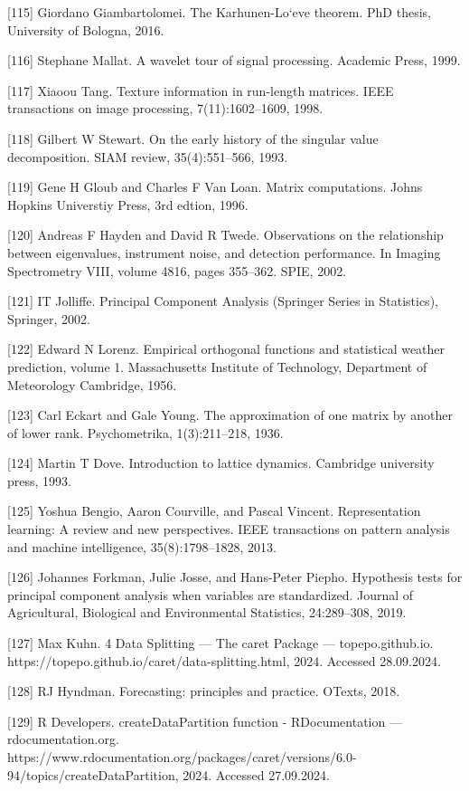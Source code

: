 \documentclass[preprint,12pt]{elsarticle}
\begin{document}
[115] Giordano Giambartolomei. The Karhunen-Lo`eve theorem. PhD thesis, University of Bologna, 2016. 

[116] Stephane Mallat. A wavelet tour of signal processing. Academic Press, 1999. 

[117] Xiaoou Tang. Texture information in run-length matrices. IEEE transactions on image processing, 7(11):1602–1609, 1998. 

[118] Gilbert W Stewart. On the early history of the singular value decomposition. SIAM review, 35(4):551–566, 1993. 

[119] Gene H Gloub and Charles F Van Loan. Matrix computations. Johns Hopkins Universtiy Press, 3rd edtion, 1996. 

[120] Andreas F Hayden and David R Twede. Observations on the relationship between eigenvalues, instrument noise, and detection performance. In Imaging Spectrometry VIII, volume 4816, pages 355–362. SPIE, 2002. 

[121] IT Jolliffe. Principal Component Analysis (Springer Series in Statistics), Springer, 2002. 

[122] Edward N Lorenz. Empirical orthogonal functions and statistical weather prediction, volume 1. Massachusetts Institute of Technology, Department of Meteorology Cambridge, 1956. 

[123] Carl Eckart and Gale Young. The approximation of one matrix by another of lower rank. Psychometrika, 1(3):211–218, 1936. 

[124] Martin T Dove. Introduction to lattice dynamics. Cambridge university press, 1993. 

[125] Yoshua Bengio, Aaron Courville, and Pascal Vincent. Representation learning: A review and new perspectives. IEEE transactions on pattern analysis and machine intelligence, 35(8):1798–1828, 2013. 

[126] Johannes Forkman, Julie Josse, and Hans-Peter Piepho. Hypothesis tests for principal component analysis when variables are standardized. Journal of Agricultural, Biological and Environmental Statistics, 24:289–308, 2019. 

[127] Max Kuhn. 4 Data Splitting — The caret Package — topepo.github.io. https://topepo.github.io/caret/data-splitting.html, 2024. Accessed 28.09.2024. 

[128] RJ Hyndman. Forecasting: principles and practice. OTexts, 2018. 

[129] R Developers. createDataPartition function - RDocumentation — rdocumentation.org. https://www.rdocumentation.org/packages/caret/versions/6.0-94/topics/createDataPartition, 2024. Accessed 27.09.2024. 
\end{document}
